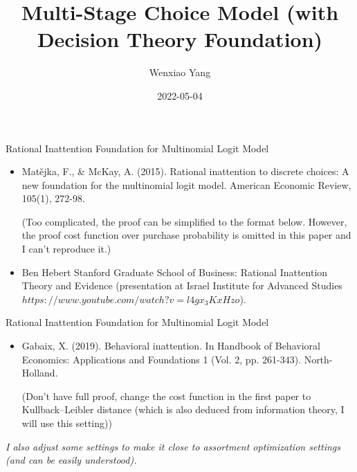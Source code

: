 \documentclass{beamer}
\title[Multi-Stage Choice Model \hspace{0.5cm}\insertframenumber/\inserttotalframenumber]{Multi-Stage Choice Model (with Decision Theory Foundation)}
\author{Wenxiao Yang}
\institute{University of Illinois at Urbana-Champaign\\Department of Mathematics}
\date{2022-05-04}
\begin{document}
\begin{frame}
  \titlepage
\end{frame}



\begin{frame}{Rational Inattention Foundation for Multinomial Logit Model}

\begin{itemize}
  \item Matějka, F., \& McKay, A. (2015). Rational inattention to discrete choices: A new foundation for the multinomial logit model. American Economic Review, 105(1), 272-98.
  
  (Too complicated, the proof can be simplified to the format below. However, the proof cost function over purchase probability is omitted in this paper and I can't reproduce it.)
  \item Ben Hebert Stanford Graduate School of Business: Rational Inattention Theory and Evidence (presentation at Israel Institute for Advanced Studies $https://www.youtube.com/watch?v=l4gx_3KxHzo$).
  
\end{itemize}

\vskip 0.2cm


\end{frame}


\begin{frame}{Rational Inattention Foundation for Multinomial Logit Model}
\begin{itemize}
  \item Gabaix, X. (2019). Behavioral inattention. In Handbook of Behavioral Economics: Applications and Foundations 1 (Vol. 2, pp. 261-343). North-Holland.
  
  (Don't have full proof, change the cost function in the first paper to Kullback–Leibler distance (which is also deduced from information theory, I will use this setting))
\end{itemize}
\textit{I also adjust some settings to make it close to assortment optimization settings (and can be easily understood).}

\end{frame}
\end{document}
